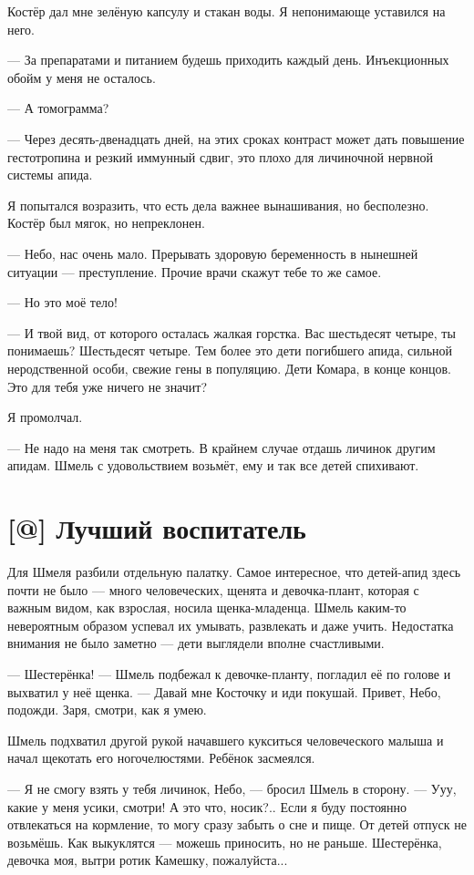 Костёр дал мне зелёную капсулу и стакан воды.
Я непонимающе уставился на него.

--- За препаратами и питанием будешь приходить каждый день.
Инъекционных обойм у меня не осталось.

--- А томограмма?

--- Через десять-двенадцать дней, на этих сроках контраст может дать повышение гестотропина и резкий иммунный сдвиг, это плохо для личиночной нервной системы апида.

Я попытался возразить, что есть дела важнее вынашивания, но бесполезно.
Костёр был мягок, но непреклонен.

--- Небо, нас очень мало.
Прерывать здоровую беременность в нынешней ситуации --- преступление.
Прочие врачи скажут тебе то же самое.

--- Но это моё тело!

--- И твой вид, от которого осталась жалкая горстка.
Вас шестьдесят четыре, ты понимаешь?
Шестьдесят четыре.
Тем более это дети погибшего апида, сильной неродственной особи, свежие гены в популяцию.
Дети Комара, в конце концов.
Это для тебя уже ничего не значит?

Я промолчал.

--- Не надо на меня так смотреть.
В крайнем случае отдашь личинок другим апидам.
Шмель с удовольствием возьмёт, ему и так все детей спихивают.

\section{[@] Лучший воспитатель}

Для Шмеля разбили отдельную палатку.
Самое интересное, что детей-апид здесь почти не было --- много человеческих, щенята и девочка-плант, которая с важным видом, как взрослая, носила щенка-младенца.
Шмель каким-то невероятным образом успевал их умывать, развлекать и даже учить.
Недостатка внимания не было заметно --- дети выглядели вполне счастливыми.

--- Шестерёнка! --- Шмель подбежал к девочке-планту, погладил её по голове и выхватил у неё щенка.
--- Давай мне Косточку и иди покушай.
Привет, Небо, подожди.
Заря, смотри, как я умею.

Шмель подхватил другой рукой начавшего кукситься человеческого малыша и начал щекотать его ногочелюстями.
Ребёнок засмеялся.

--- Я не смогу взять у тебя личинок, Небо, --- бросил Шмель в сторону.
--- Ууу, какие у меня усики, смотри!
А это что, носик?..
Если я буду постоянно отвлекаться на кормление, то могу сразу забыть о сне и пище.
От детей отпуск не возьмёшь.
Как выкуклятся --- можешь приносить, но не раньше.
Шестерёнка, девочка моя, вытри ротик Камешку, пожалуйста...

